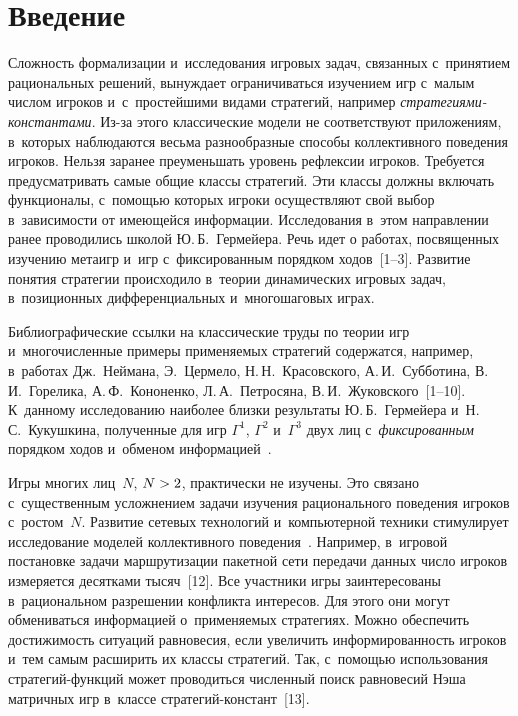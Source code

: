 \vspace*{-3pt}


\thispagestyle{headings}

\begin{multicols}{2}

\label{st\stat}

\section{Введение}

    Сложность формализации и~исследования игровых задач, связанных с~принятием рациональных решений, вынуждает ограничиваться изучением игр с~малым числом игроков и~с~простейшими видами стратегий, например
    \textit{стра\-те\-ги\-ями-констан\-та\-ми}. Из-за этого классические модели не
соответствуют приложениям, в~которых наблюдаются весьма разнообразные
способы коллективного поведения игроков. Нельзя заранее преуменьшать уровень
рефлексии игроков. Требуется предусмат\-ри\-вать самые общие классы стратегий. Эти
классы должны включать функционалы, с~помощью которых игроки осуществляют
свой выбор в~зависимости от имеющейся информации.
Исследования в~этом
направлении ранее проводились школой Ю.\,Б.~Гермейера. Речь идет о работах,
посвященных\linebreak
 изучению метаигр и~игр с~фиксированным порядком ходов~[1--3].
Развитие понятия стратегии происходило в~теории динамических игровых задач,
в~позиционных дифференциальных и~многошаговых играх.

Библиографические
ссылки на классические труды по теории игр и~многочисленные примеры
применяемых стратегий содержатся, например, в~работах Дж.~Неймана, Э.~Цермело,
Н.\,Н.~Красовского, А.\,И.~Субботина,
В.\,И.~Горелика, А.\,Ф.~Кононенко, Л.\,А.~Петросяна, В.\,И.~Жуковского~[1--10].
К~данному исследованию наиболее
близки результаты Ю.\,Б.~Гермейера и~Н.\,С.~Кукушкина, полученные для игр
$\Gamma^1$, $\Gamma^2$ и~$\Gamma^3$ двух лиц с~\textit{фиксированным}
порядком ходов и~обменом информацией~\cite{1-vas, 4-vas}.

    Игры многих лиц~$N$, $N\hm>2$, практически не изуче\-ны.
    Это связано с~существенным усложнением задачи изучения рационального
    поведения игроков с~ростом~$N$. Развитие сетевых технологий и~компьютерной
    техники стимулирует
исследование моделей коллективного поведения~\cite{11-vas}. Например, в~игровой
постановке задачи маршрутизации пакетной сети передачи данных число игроков
измеряется десятками тысяч~[12]. Все участники игры заинтересованы
в~рациональном разрешении конфликта интересов. Для этого они могут обмениваться
информацией о~применяемых стратегиях. Можно обеспечить достижимость
ситуаций равновесия, если увеличить информированность игроков и~тем самым
расширить их классы стратегий. Так, с~помощью использования стратегий-функций
может проводиться численный поиск равновесий Нэша матричных игр в~классе
стратегий-констант~[13].


\end{multicols}
